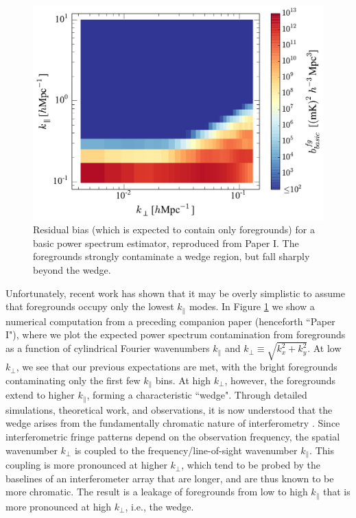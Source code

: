 \documentclass[twocolumn,aps,prd,nofootinbib,showpacs]{revtex4-1}
\begin{document}
\begin{figure}[!ht] 
	\centering 
	\includegraphics[width=.49\textwidth]{figures/simpleEstBias.pdf}
	\caption{Residual bias (which is expected to contain only foregrounds) for a basic power spectrum estimator, reproduced from Paper I.  The foregrounds strongly contaminate a wedge region, but fall sharply beyond the wedge.}
	\label{fig:basicEstBias}
\end{figure} 

Unfortunately, recent work has shown that it may be overly simplistic to assume that foregrounds occupy only the lowest $k_\parallel$ modes.  In Figure \ref{fig:basicEstBias} we show a numerical computation from a preceding companion paper (henceforth ``Paper I"), where we plot the expected power spectrum contamination from foregrounds as a function of cylindrical Fourier wavenumbers $k_\parallel$ and $k_\perp \equiv \sqrt{k_x^2 + k_y^2}$.  At low $k_\perp$, we see that our previous expectations are met, with the bright foregrounds contaminating only the first few $k_\parallel$ bins.  At high $k_\perp$, however, the foregrounds extend to higher $k_\parallel$, forming a characteristic ``wedge".  Through detailed simulations, theoretical work, and observations, it is now understood that the wedge arises from the fundamentally chromatic nature of interferometry \cite{Datta2010,Vedantham2012,Parsons2012b,Morales2012,Trott2012,Thyagarajan2013,Hazelton2013,Pober2013b,Dillon2014}.  Since interferometric fringe patterns depend on the observation frequency, the spatial wavenumber $k_\perp$ is coupled to the frequency/line-of-sight wavenumber $k_\parallel$.  This coupling is more pronounced at higher $k_\perp$, which tend to be probed by the baselines of an interferometer array that are longer, and are thus known to be more chromatic.  The result is a leakage of foregrounds from low to high $k_\parallel$ that is more pronounced at high $k_\perp$, i.e., the wedge.
\end{document}
